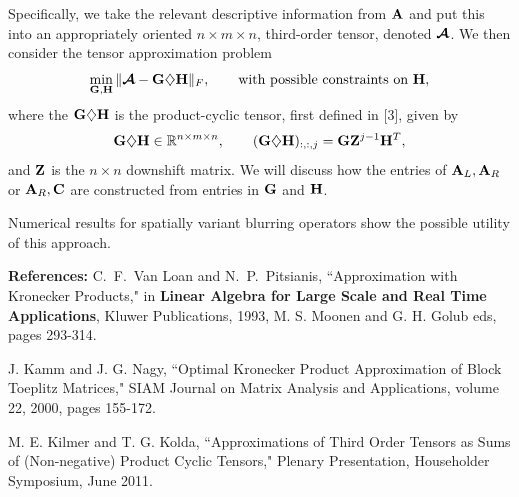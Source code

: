 \documentclass{report}
\begin{document}
Specifically,
we take the relevant descriptive information from ${\bf A}$ and put this
into an appropriately oriented $n \times m \times n$, third-order tensor,
denoted $\TA$.
We then consider the tensor approximation problem
\[ \min_{\M{G},\M{H}} \| \TA - \M{G} \Mout \M{H} \|_F, \qquad \mbox{with
possible constraints on \M{H}},\]
where the $\M{G} \Mout \M{H}$ is the product-cyclic tensor, first defined
in [3], given by
\[ \M{G} \Mout \M{H} \in \mathbb{R}^{n \times m \times n}, \qquad (\M{G}
\Mout \M{H})_{:,:,j} = \M{G} \M{Z}^{j-1} \M{H}^T, \]
and $\M{Z}$ is the $n \times n$ downshift matrix.
We will discuss how the entries of ${\bf A}_L, {\bf A}_R$ or $\bfA_R, \M{C}$ are
constructed from entries in $\M{G}$ and $\M{H}$.

Numerical results for spatially variant blurring operators show the
possible utility of this approach.

\vspace*{8pt}

{\bf References:} \newline
\noindent{[1]} C.~F.~{Van Loan} and N.~P.~Pitsianis, ``Approximation with
{K}ronecker Products," in {\bf Linear Algebra for Large Scale and Real
Time Applications},
Kluwer Publications, 1993, M. S. Moonen and G. H. Golub eds, pages 293-314. \newline

\noindent{[2]} J. Kamm and J. G. Nagy, ``Optimal {K}ronecker Product
Approximation of Block {T}oeplitz Matrices," SIAM Journal on Matrix
Analysis and Applications,
volume 22, 2000, pages 155-172. \newline

\noindent{[3]} M. E. Kilmer and T. G. Kolda, ``Approximations of Third Order Tensors as
Sums of (Non-negative) Product Cyclic Tensors," Plenary Presentation,
Householder Symposium, June 2011.
\end{document}
